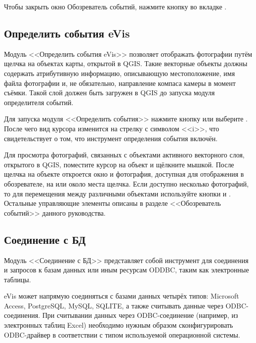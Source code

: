 Чтобы закрыть окно Обозреватель событий, нажмите кнопку 
во вкладке .

\subsection{Определить события eVis}\label{evis_id_tool}

Модуль <<Определить события eVis>> позволяет отображать фотографии путём
щелчка на объектах карты, открытой в QGIS. Такие векторные объекты должны
содержать атрибутивную информацию, описывающую местоположение, имя файла
фотографии и, не обязательно, направление компаса камеры в момент съёмки.
Такой слой должен быть загружен в QGIS до запуска модуля определителя
событий.

\label{evis_launch_id}

Для запуска модуля <<Определить события>> нажмите кнопку
 или выберите
 \arrow {} \arrow
{}. После чего вид курсора изменится
на стрелку с символом <<i>>, что свидетельствует о том, что инструмент
определения события включён.

Для просмотра фотографий, связанных с объектами активного векторного слоя,
открытого в QGIS, поместите курсор на объект и щёлкните мышкой.
После щелчка на объекте откроется окно  и
фотография, доступная для отображения в обозревателе, на или около места
щелчка. Если доступно несколько фотографий, то для перемещения между
различными объектами используйте кнопки  и
. Остальные управляющие элементы описаны в разделе
<<Обозреватель событий>> данного руководства.

\subsection{Соединение с БД}\label{evis_database}

Модуль <<Соединение с БД>> представляет собой инструмент для соединения и
запросов к базам данных или иным ресурсам ODDBC, таким как электронные
таблицы.

eVis может напрямую соединяться с базами данных четырёх типов: Microsoft Access,
PostgreSQL, MySQL, SQLITE, а также считывать данные через ODBC-соединения. При
считывании данных через ODBC-соединение (например, из электронных таблиц Excel)
необходимо нужным образом сконфигурировать ODBC-драйвер в соответствии с типом
используемой операционной системы.

